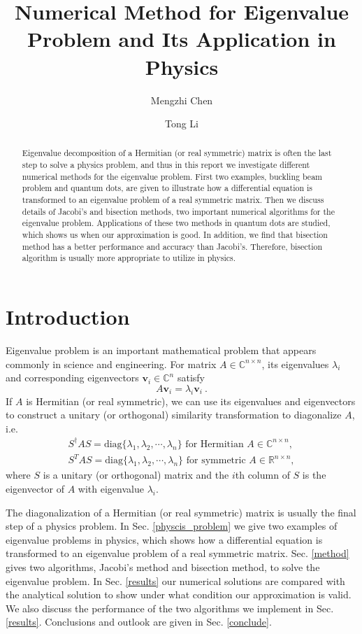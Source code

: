 \documentclass{article}
\title{Numerical Method for Eigenvalue Problem and Its Application in Physics}
\author[1]{Mengzhi Chen}
\author[1]{Tong Li}
\affil[1]{Department of Physics and Astronomy, Michigan State University}
\date{}
\begin{document}
	\maketitle
	\begin{abstract}\label{abstract}
Eigenvalue decomposition of a Hermitian (or real symmetric) matrix is often the last step to solve a physics problem, and thus 
in this report we investigate different numerical methods for the eigenvalue problem. 
First two examples, buckling beam problem and quantum dots, are given to illustrate how a differential equation is transformed 
to an eigenvalue problem of a real symmetric matrix. 
Then we discuss details of Jacobi's and bisection methods, two important numerical algorithms for the eigenvalue problem. 
Applications of these two methods in quantum dots are studied, which shows us when our approximation is good. 
In addition, we find that bisection method has a better performance and accuracy than Jacobi's. 
Therefore, bisection algorithm is usually more appropriate to utilize in physics. 
	\end{abstract}

	\section{Introduction}\label{intro}
Eigenvalue problem is an important mathematical problem that appears commonly in science and engineering. 
For matrix $A\in\mathbb{C}^{n \times n}$, its eigenvalues $\lambda_i$ and corresponding eigenvectors $\mathbf{v}_i\in\mathbb{C}^n$ satisfy
\begin{equation}
A\mathbf{v}_i=\lambda_i \mathbf{v}_i\ .
\end{equation}
If $A$ is Hermitian (or real symmetric), we can use its eigenvalues and eigenvectors to construct a unitary (or orthogonal) 
similarity transformation to diagonalize $A$, i.e. 
\begin{eqnarray}
S^{\dagger}AS=\text{diag}\{\lambda_1,\lambda_2,\cdots,\lambda_n\}\text{ for Hermitian }A\in\mathbb{C}^{n\times n}, \\
S^{T}AS=\text{diag}\{\lambda_1,\lambda_2,\cdots,\lambda_n\}\text{ for symmetric }A\in\mathbb{R}^{n\times n},
\end{eqnarray}
where $S$ is a unitary (or orthogonal) matrix and the $i$th column of $S$ is the eigenvector of $A$ with eigenvalue $\lambda_i$. 
\par
The diagonalization of a Hermitian (or real symmetric) matrix is usually the final step of a physics problem. 
In Sec. \ref{physcis_problem} we give two examples of eigenvalue problems in physics, which shows how a differential equation 
is transformed to an eigenvalue problem of a real symmetric matrix. 
Sec. \ref{method} gives two algorithms, Jacobi's method and bisection method, to solve the eigenvalue problem. 
In Sec. \ref{results} our numerical solutions are compared with the analytical solution 
to show under what condition our approximation is valid. 
We also discuss the performance of the two algorithms we implement in Sec. \ref{results}. 
Conclusions and outlook are given in Sec. \ref{conclude}. 
	
\end{document}
